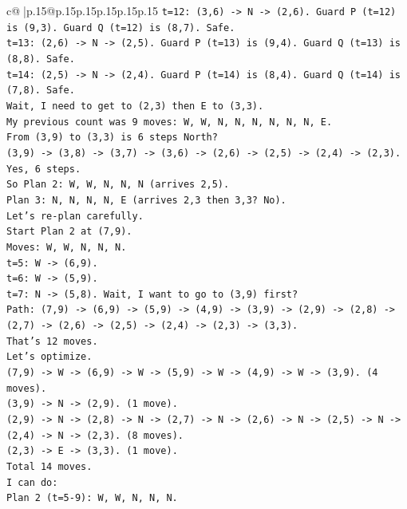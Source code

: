 \documentclass{article}
\begin{document}
{\begin{supertabular}{c@{$\;$}|p{.15\linewidth}@{}p{.15\linewidth}p{.15\linewidth}p{.15\linewidth}p{.15\linewidth}p{.15\linewidth}}
{{{\texttt{t=12: (3,6) {-}> N {-}> (2,6). Guard P (t=12) is (9,3). Guard Q (t=12) is (8,7). Safe.} \\
\texttt{t=13: (2,6) {-}> N {-}> (2,5). Guard P (t=13) is (9,4). Guard Q (t=13) is (8,8). Safe.} \\
\texttt{t=14: (2,5) {-}> N {-}> (2,4). Guard P (t=14) is (8,4). Guard Q (t=14) is (7,8). Safe.} \\
\texttt{Wait, I need to get to (2,3) then E to (3,3).} \\
\texttt{My previous count was 9 moves: W, W, N, N, N, N, N, N, E.} \\
\texttt{From (3,9) to (3,3) is 6 steps North?} \\
\texttt{(3,9) {-}> (3,8) {-}> (3,7) {-}> (3,6) {-}> (2,6) {-}> (2,5) {-}> (2,4) {-}> (2,3).} \\
\texttt{Yes, 6 steps.} \\
\texttt{So Plan 2: W, W, N, N, N (arrives 2,5).} \\
\texttt{Plan 3: N, N, N, N, E (arrives 2,3 then 3,3? No).} \\
\texttt{Let's re{-}plan carefully.} \\
\texttt{Start Plan 2 at (7,9).} \\
\texttt{Moves: W, W, N, N, N.} \\
\texttt{t=5: W {-}> (6,9).} \\
\texttt{t=6: W {-}> (5,9).} \\
\texttt{t=7: N {-}> (5,8). Wait, I want to go to (3,9) first?} \\
\texttt{Path: (7,9) {-}> (6,9) {-}> (5,9) {-}> (4,9) {-}> (3,9) {-}> (2,9) {-}> (2,8) {-}> (2,7) {-}> (2,6) {-}> (2,5) {-}> (2,4) {-}> (2,3) {-}> (3,3).} \\
\texttt{That's 12 moves.} \\
\texttt{Let's optimize.} \\
\texttt{(7,9) {-}> W {-}> (6,9) {-}> W {-}> (5,9) {-}> W {-}> (4,9) {-}> W {-}> (3,9). (4 moves).} \\
\texttt{(3,9) {-}> N {-}> (2,9). (1 move).} \\
\texttt{(2,9) {-}> N {-}> (2,8) {-}> N {-}> (2,7) {-}> N {-}> (2,6) {-}> N {-}> (2,5) {-}> N {-}> (2,4) {-}> N {-}> (2,3). (8 moves).} \\
\texttt{(2,3) {-}> E {-}> (3,3). (1 move).} \\
\texttt{Total 14 moves.} \\
\texttt{I can do:} \\
\texttt{Plan 2 (t=5{-}9): W, W, N, N, N.} \\
}}}
\end{supertabular}}
\end{document}
